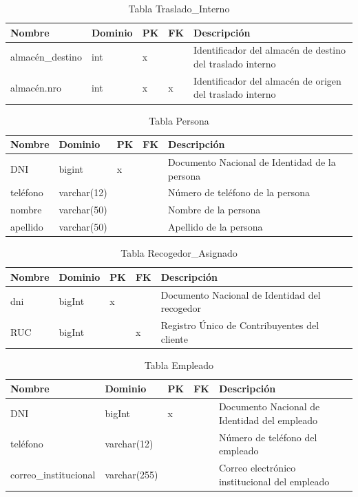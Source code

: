 \documentclass[10pt, a4paper,openany]{report}
\begin{document}
\begin{table}[h]
\centering
\begin{tabular}{|l|p{1.5cm}|p{0.5cm}|p{0.5cm}|p{3cm}|}
\hline
\textbf{Nombre} &
\textbf{Dominio} &
\textbf{PK} &
\textbf{FK} &
\textbf{Descripción} \\
\hline
almacén\_destino & int & x &  & Identificador del almacén de destino del traslado interno \\
\hline
almacén.nro & int &x & x & Identificador del almacén de origen del traslado interno \\
\hline
\end{tabular}
\caption{Tabla Traslado\_Interno}
\end{table}

\begin{table}[h]
\centering
\begin{tabular}{|l|p{1.8cm}|p{0.5cm}|p{0.5cm}|p{3cm}|}
\hline
\textbf{Nombre} &
\textbf{Dominio} &
\textbf{PK} &
\textbf{FK} &
\textbf{Descripción} \\
\hline
DNI & bigint & x & & Documento Nacional de Identidad de la persona \\
\hline
teléfono & varchar(12) & & & Número de teléfono de la persona \\
\hline
nombre & varchar(50) & & & Nombre de la persona \\
\hline
apellido & varchar(50) & & & Apellido de la persona \\
\hline
\end{tabular}
\caption{Tabla Persona}
\end{table}
\begin{table}[h]
\centering
\begin{tabular}{|l|p{1.5cm}|p{0.5cm}|p{0.5cm}|p{3cm}|}
\hline
\textbf{Nombre} & \textbf{Dominio} & \textbf{PK} & \textbf{FK} & \textbf{Descripción} \\
\hline
dni & bigInt & x & & Documento Nacional de Identidad del recogedor \\
\hline
RUC & bigInt & & x & Registro Único de Contribuyentes del cliente \\
\hline
\end{tabular}
\caption{Tabla Recogedor\_Asignado}
\end{table}


\begin{table}[h]
\centering
\begin{tabular}{|l|p{2cm}|p{0.5cm}|p{0.5cm}|p{3cm}|}
\hline
\textbf{Nombre} & \textbf{Dominio} & \textbf{PK} & \textbf{FK} & \textbf{Descripción} \\
\hline
DNI & bigInt & x & & Documento Nacional de Identidad del empleado \\
\hline
teléfono & varchar(12) & & & Número de teléfono del empleado \\
\hline
correo\_institucional & varchar(255) & & & Correo electrónico institucional del empleado \\
\hline
\end{tabular}
\caption{Tabla Empleado}
\end{table}
\end{document}
